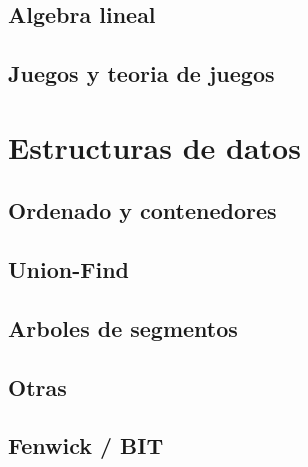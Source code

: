 \documentclass{article}
\begin{document}
	\subsection{Algebra lineal}
	
	

	\subsection{Juegos y teoria de juegos}
	
	

	\section{Estructuras de datos}
	\subsection{Ordenado y contenedores}
	
	
	

	\subsection{Union-Find}
	
	

	\subsection{Arboles de segmentos}
	
	
	
	
	
	
	

	\subsection{Otras}
	

	\subsection{Fenwick / BIT}
	
	
	
\end{document}
